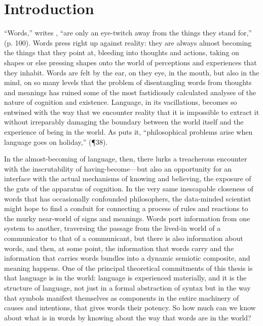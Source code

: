 \chapter{Introduction}
``Words,'' writes \cite{Pynchon1973}, ``are only an eye-twitch away from the things they stand for,'' (p. 100).  Words press right up against reality: they are always almost becoming the things that they point at, bleeding into thoughts and actions, taking on shapes or else pressing shapes onto the world of perceptions and experiences that they inhabit.  Words are felt by the ear, on they eye, in the mouth, but also in the mind, on so many levels that the problem of disentangling words from thoughts and meanings has ruined some of the most fastidiously calculated analyses of the nature of cognition and existence.  Language, in its vacillations, becomes so entwined with the way that we encounter reality that it is impossible to extract it without irreparably damaging the boundary between the world itself and the experience of being in the world.  As \cite{Wittgenstein1953} puts it, ``philosophical problems arise when language goes on holiday,'' (\P 38).

In the almost-becoming of language, then, there lurks a treacherous encounter with the inscrutability of having-become---but also an opportunity for an interface with the actual mechanisms of knowing and believing, the exposure of the guts of the apparatus of cognition.  In the very same inescapable closeness of words that has occasionally confounded philosophers, the data-minded scientist might hope to find a conduit for connecting a process of rules and reactions to the murky near-world of signs and meanings.  Words port information from one system to another, traversing the passage from the lived-in world of a communicator to that of a communicant, but there is also information about words, and then, at some point, the information that words carry and the information that carries words bundles into a dynamic semiotic composite, and meaning happens.  One of the principal theoretical commitments of this thesis is that language is in the world: language is experienced materially, and it is the structure of language, not just in a formal abstraction of syntax but in the way that symbols manifest themselves as components in the entire machinery of causes and intentions, that gives words their potency.  So how much can we know about what is in words by knowing about the way that words are in the world?

